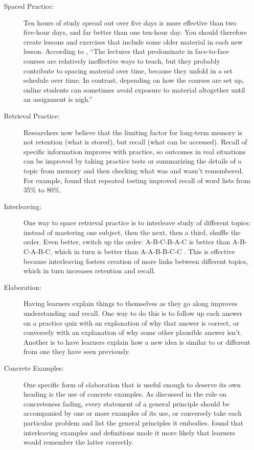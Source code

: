 \documentclass[10pt,letterpaper]{article}
\begin{document}
\begin{description}

\item[Spaced Practice:] Ten hours of study spread out over five days is more
  effective than two five-hour days, and far better than one ten-hour day. You
  should therefore create lessons and exercises that include some older material
  in each new lesson.  According to \cite{Mill2016}, ``The lectures that
  predominate in face-to-face courses are relatively ineffective ways to teach,
  but they probably contribute to spacing material over time, because they
  unfold in a set schedule over time.  In contrast, depending on how the courses
  are set up, online students can sometimes avoid exposure to material
  altogether until an assignment is nigh.''

\item[Retrieval Practice:] Researchers now believe that the limiting factor for
  long-term memory is not retention (what is stored), but recall (what can be
  accessed).  Recall of specific information improves with practice, so outcomes
  in real situations can be improved by taking practice tests or summarizing the
  details of a topic from memory and then checking what was and wasn't
  remembered. For example, \cite{Karp2008} found that repeated testing improved
  recall of word lists from 35\% to 80\%.

\item[Interleaving:] One way to space retrieval practice is to interleave study
  of different topics: instead of mastering one subject, then the next, then a
  third, shuffle the order. Even better, switch up the order: A-B-C-B-A-C is
  better than A-B-C-A-B-C, which in turn is better than A-A-B-B-C-C
  \cite{Rohr2015}. This is effective because interleaving fosters creation of
  more links between different topics, which in turn increases retention and
  recall.

\item[Elaboration:] Having learners explain things to themselves as they go
  along improves understanding and recall. One way to do this is to follow up
  each answer on a practice quiz with an explanation of why that answer is
  correct, or conversely with an explanation of why some other plausible answer
  isn't. Another is to have learners explain how a new idea is similar to or
  different from one they have seen previously.

\item[Concrete Examples:] One specific form of elaboration that is useful enough
  to deserve its own heading is the use of concrete examples.  As discussed in
  the rule on concreteness fading, every statement of a general principle should
  be accompanied by one or more examples of its use, or conversely take each
  particular problem and list the general principles it
  embodies. \cite{Raws2014} found that interleaving examples and definitions
  made it more likely that learners would remember the latter correctly.


\end{description}
\end{document}
